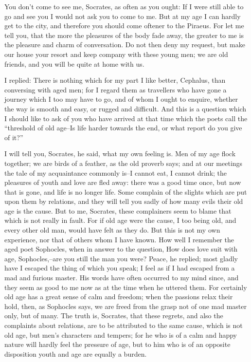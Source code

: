 You don't come to see me, Socrates, as often as you ought: If I were
still able to go and see you I would not ask you to come to me. But
at my age I can hardly get to the city, and therefore you should come
oftener to the Piraeus. For let me tell you, that the more the pleasures
of the body fade away, the greater to me is the pleasure and charm
of conversation. Do not then deny my request, but make our house your
resort and keep company with these young men; we are old friends, and
you will be quite at home with us.

I replied: There is nothing which for my part I like better, Cephalus,
than conversing with aged men; for I regard them as travellers who
have gone a journey which I too may have to go, and of whom I ought to
enquire, whether the way is smooth and easy, or rugged and difficult.
And this is a question which I should like to ask of you who have
arrived at that time which the poets call the ``threshold of old age--Is
life harder towards the end, or what report do you give of it?''

I will tell you, Socrates, he said, what my own feeling is. Men of my
age flock together; we are birds of a feather, as the old proverb says;
and at our meetings the tale of my acquaintance commonly is--I cannot
eat, I cannot drink; the pleasures of youth and love are fled away:
there was a good time once, but now that is gone, and life is no longer
life. Some complain of the slights which are put upon them by relations,
and they will tell you sadly of how many evils their old age is the
cause. But to me, Socrates, these complainers seem to blame that which
is not really in fault. For if old age were the cause, I too being old,
and every other old man, would have felt as they do. But this is not
my own experience, nor that of others whom I have known. How well I
remember the aged poet Sophocles, when in answer to the question, How
does love suit with age, Sophocles,--are you still the man you were?
Peace, he replied; most gladly have I escaped the thing of which you
speak; I feel as if I had escaped from a mad and furious master. His
words have often occurred to my mind since, and they seem as good to
me now as at the time when he uttered them. For certainly old age has
a great sense of calm and freedom; when the passions relax their hold,
then, as Sophocles says, we are freed from the grasp not of one mad
master only, but of many. The truth is, Socrates, that these regrets,
and also the complaints about relations, are to be attributed to the
same cause, which is not old age, but men's characters and tempers; for
he who is of a calm and happy nature will hardly feel the pressure of
age, but to him who is of an opposite disposition youth and age are
equally a burden.

